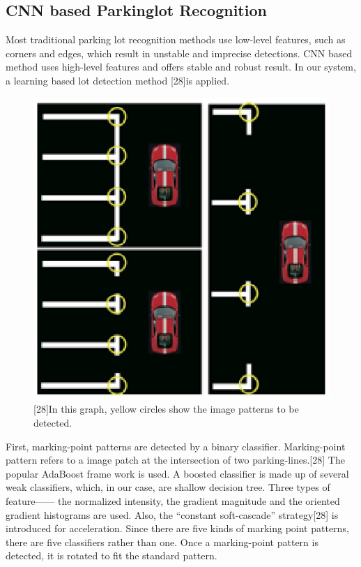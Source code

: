 \documentclass[journal]{IEEEtran}
\begin{document}
\subsection{CNN based Parkinglot Recognition}

Most traditional parking lot recognition methods use low-level features, such as corners and edges, which result in unstable and imprecise detections. CNN based method uses high-level features and offers stable and robust result. In our system, a learning based lot detection method [28]is applied.

\begin{figure}
\centering
\includegraphics{fig3_CNN_based_Parkinglot_Recognition}
\caption{
[28]In this graph, yellow circles show the image patterns to be detected.
}\label{fig:3}
\end{figure}

First, marking-point patterns are detected by a binary classifier. Marking-point pattern refers to a image patch at the intersection of two parking-lines.[28] The popular AdaBoost frame work is used. A boosted classifier is made up of several weak classifiers, which, in our case, are shallow decision tree. Three types of feature—— the normalized intensity, the gradient magnitude and the oriented gradient histograms are used. Also, the “constant soft-cascade” strategy[28] is introduced for acceleration. Since there are five kinds of marking point patterns, there are five classifiers rather than one. Once a marking-point pattern is detected, it is rotated to fit the standard pattern. 
\end{document}
